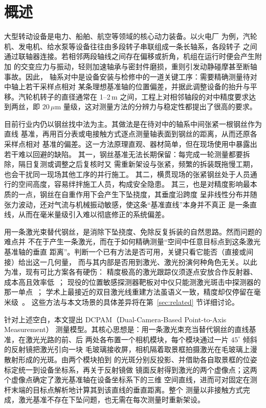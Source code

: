 \section{概述}
\label{sec:intro}

大型转动设备是电力、船舶、航空等领域的核心动力装备。以火电厂
为例，汽轮机、发电机、给水泵等设备往往由多段转子串联组成一条长轴系，各段转子
之间通过联轴器连接。若相邻两段轴线之间存在偏移或折角，机组在运行时便会产生附加
的交变应力与振动，轻则加速轴承与密封件磨损，重则引发动静碰摩甚至断轴事故。因此，
轴系对中是设备安装与检修中的一道关键工序：需要精确测量待对中轴上若干采样点相对
某条理想基准轴的位置偏差，并据此调整设备的抬升与平移。汽轮机转子的直径通常在
1--2\,m 之间，工程上对相邻轴段的对中精度要求达到两丝，即 $20\,\mu\mathrm{m}$
量级，这对测量方法的分辨力与稳定性都提出了很高的要求。

目前行业内仍以钢丝找中法为主。其做法是在待对中的轴系中间张紧一根钢丝作为直线
基准，再用百分表或电接触方式逐点测量轴表面到钢丝的距离，从而还原各采样点相对
基准的偏差。这一方法原理直观、器材简单，但在现场使用中暴露出若干难以回避的缺陷。
其一，钢丝基准无法长期保留：每完成一轮测量都要拆除，隔日复测或调整之后复核时又
需重新架设与张紧，频繁的拆装既拖慢工期，也会干扰同一现场其他工序的并行施工。
其二，横贯现场的张紧钢丝处于人员通行的空间高度，容易绊拌施工人员，构成安全隐患。
其三，也是对精度影响最本质的一点，钢丝在自重作用下会产生下坠挠度，其垂度沿跨度
呈非线性分布并随张力波动，还对气流与机械振动敏感，使这条“基准直线”本身并不真正
是一条直线，从而在毫米量级引入难以彻底修正的系统偏差。

用一条激光束替代钢丝，是消除下坠挠度、免除反复拆装的自然思路。然而问题的难点并
不在于产生一条激光，而在于如何精确测量“空间中任意目标点到这条激光基准轴的垂直
距离”。判断一个已有方法是否可用，关键只看它能否（直接或间接）给出这一几何量，
而与其内部是否用到激光、激光扮演何种角色无关。以此为准，现有可比方案各有硬伤：
精度极高的激光跟踪仪须逐点安放合作反射器、成本高且效率低~\cite{api_radian,leica_at960}；
现役的位置敏感探测器靶板对中仪只能测激光斑击中探测器的那一单点~\cite{easylaser_xt770,fixturlaser_nxa}；
学术上最接近的双目激光线重建方法虽语义一致，精度却仅停留在毫米级~\cite{zhong2021line3d}。
这些方法与本文场景的具体差异将在第~\ref{sec:related} 节详细讨论。

针对上述空白，本文提出 DCPAM（Dual-Camera-Based Point-to-Axis Measurement）
测量模型。其核心思想是：用一条激光束充当替代钢丝的直线基准，在激光光路的前、后
两处各布置一个相机模块，每个模块通过一片 $45^\circ$ 倾斜的反射镜把激光引向一块
毛玻璃接收屏，相机隔着取景框拍摄激光在毛玻璃上漫散射形成的光斑。由两个模块拍到
的光斑分别反投影、并借助各自取景框的位姿标定统一到设备坐标系，再关于反射镜做
镜面反射得到激光的两个虚像点；这两个虚像点确定了激光基准轴在设备坐标系下的三维
空间直线，进而可对固定在测杆末端的目标点解析地计算其到该直线的垂直距离。整个
测量以非接触方式完成，激光基准不存在下坠问题，也无需在每次测量时重新架设。

